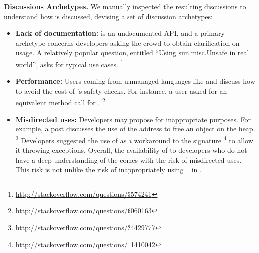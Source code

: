{ \bfseries Discussions Archetypes. } 
We manually inspected the resulting discussions to understand how \smu{} is discussed, devising a set of discussion archetypes:

\begin{itemize}
\item\textbf{Lack of documentation:}
\unsafe{} is an undocumented API,
and a primary archetype concerns developers asking the crowd to obtain clarification on usage.
A relatively popular question, entitled ``Using sun.misc.Unsafe in real world'',
asks for typical use cases.%
\footnote{\url{http://stackoverflow.com/questions/5574241}}

\item\textbf{Performance:}
Users coming from unmanaged languages like \cc{} and \cpp{} discuss how to avoid the cost of \java{}'s safety checks.
For instance, a user asked for an equivalent method call for .%
\footnote{\url{http://stackoverflow.com/questions/6060163}}

\item \textbf{Misdirected uses:}
Developers may propose \unsafe{} for inappropriate purposes.
For example, a post discusses the use of the address to free an object on the \java{} heap.%
\footnote{\url{http://stackoverflow.com/questions/24429777}}
Developers suggested the use of \unsafe{} as a workaround to the  signature%
\footnote{\url{http://stackoverflow.com/questions/11410042}}
to allow it throwing exceptions.
Overall, the availability of \unsafe{} to developers who do not have a deep understanding of the \jvm{} comes with the risk of misdirected uses.
This risk is not unlike the risk of inappropriately using ~\citep{richardsEvalThatMen2011} in \javascript{}.

\end{itemize}

